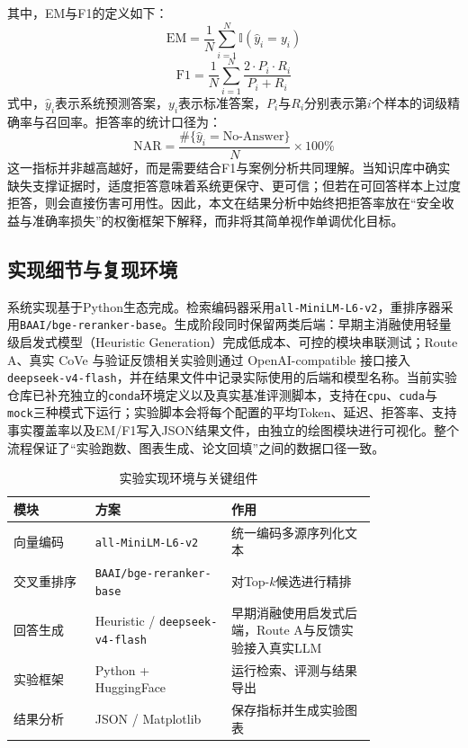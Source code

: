 其中，EM与F1的定义如下：
\begin{equation}
    \mathrm{EM} = \frac{1}{N}\sum_{i=1}^{N}\mathbb{I}(\hat{y}_i = y_i)
\end{equation}
\begin{equation}
    \mathrm{F1} = \frac{1}{N}\sum_{i=1}^{N} \frac{2 \cdot P_i \cdot R_i}{P_i + R_i}
\end{equation}
式中，$\hat{y}_i$表示系统预测答案，$y_i$表示标准答案，$P_i$与$R_i$分别表示第$i$个样本的词级精确率与召回率。拒答率的统计口径为：
\begin{equation}
    \mathrm{NAR} = \frac{\#\{\hat{y}_i = \text{No-Answer}\}}{N}\times 100\%
\end{equation}
这一指标并非越高越好，而是需要结合F1与案例分析共同理解。当知识库中确实缺失支撑证据时，适度拒答意味着系统更保守、更可信；但若在可回答样本上过度拒答，则会直接伤害可用性。因此，本文在结果分析中始终把拒答率放在“安全收益与准确率损失”的权衡框架下解释，而非将其简单视作单调优化目标。

\subsection{实现细节与复现环境}

系统实现基于Python生态完成。检索编码器采用\texttt{all-MiniLM-L6-v2}，重排序器采用\texttt{BAAI/bge-reranker-base}。生成阶段同时保留两类后端：早期主消融使用轻量级启发式模型（Heuristic Generation）完成低成本、可控的模块串联测试；Route A、真实 CoVe 与验证反馈相关实验则通过 OpenAI-compatible 接口接入 \texttt{deepseek-v4-flash}，并在结果文件中记录实际使用的后端和模型名称。当前实验仓库已补充独立的\texttt{conda}环境定义以及真实基准评测脚本，支持在\texttt{cpu}、\texttt{cuda}与\texttt{mock}三种模式下运行；实验脚本会将每个配置的平均Token、延迟、拒答率、支持事实覆盖率以及EM/F1写入JSON结果文件，由独立的绘图模块进行可视化。整个流程保证了“实验跑数、图表生成、论文回填”之间的数据口径一致。

\begin{table}[H]
\centering
\caption{实验实现环境与关键组件}
\label{tab:implementation}
\small
\begin{tabular}{|p{0.18\linewidth}|p{0.30\linewidth}|p{0.32\linewidth}|}
\hline
\textbf{模块} & \textbf{方案} & \textbf{作用} \\
\hline
向量编码 & \texttt{all-MiniLM-L6-v2} & 统一编码多源序列化文本 \\
\hline
交叉重排序 & \texttt{BAAI/bge-reranker-base} & 对Top-$k$候选进行精排 \\
\hline
回答生成 & Heuristic / \texttt{deepseek-v4-flash} & 早期消融使用启发式后端，Route A与反馈实验接入真实LLM \\
\hline
实验框架 & Python + HuggingFace\cite{huggingface} & 运行检索、评测与结果导出 \\
\hline
结果分析 & JSON / Matplotlib & 保存指标并生成实验图表 \\
\hline
\end{tabular}
\end{table}

